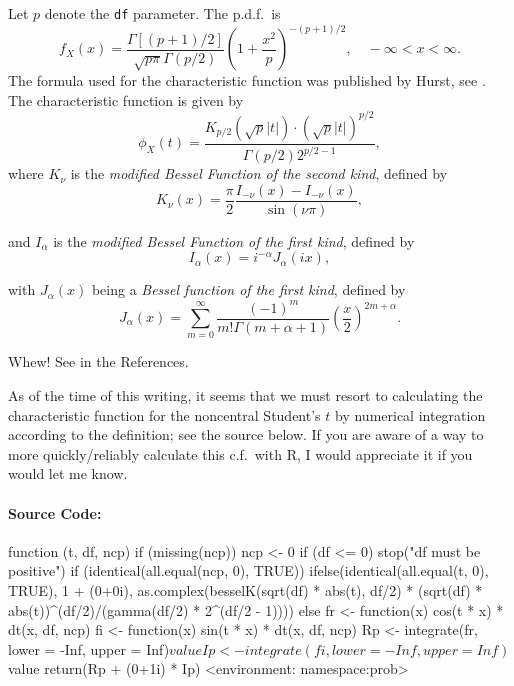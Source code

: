 \documentclass[english]{article}
\begin{document}
Let $p$ denote the \texttt{df} parameter. The p.d.f.~is \[
f_{X}(x)=\frac{\Gamma[(p+1)/2]}{\sqrt{p\pi}\Gamma(p/2)}\left(1+\frac{x^{2}}{p}\right)^{-(p+1)/2},\quad-\infty<x<\infty.\]
The formula used for the characteristic function was published by
Hurst, see \cite{studentst}. The characteristic function is given
by \[
\phi_{X}(t)=\frac{K_{p/2}(\sqrt{p}|t|)\cdot(\sqrt{p}|t|)^{p/2}}{\Gamma(p/2)2^{p/2-1}},\]
where $K_{\nu}$ is the \emph{modified Bessel Function of the second
kind}, defined by\[
K_{\nu}(x)=\frac{\pi}{2}\frac{I_{-\nu}(x)-I_{-\nu}(x)}{\sin(\nu\pi)},\]


and $I_{\alpha}$ is the \emph{modified Bessel Function of the first
kind}, defined by\[
I_{\alpha}(x)=i^{-\alpha}J_{\alpha}(ix),\]


with $J_{\alpha}(x)$ being a \emph{Bessel function of the first kind},
defined by\[
J_{\alpha}(x)=\sum_{m=0}^{\infty}\frac{(-1)^{m}}{m!\Gamma(m+\alpha+1)}\left(\frac{x}{2}\right)^{2m+\alpha}.\]


Whew! See \cite{Bessel} in the References. 

As of the time of this writing, it seems that we must resort to calculating
the characteristic function for the noncentral Student's $t$ by numerical
integration according to the definition; see the source below. If
you are aware of a way to more quickly/reliably calculate this c.f.~with
\textsf{R}, I would appreciate it if you would let me know.


\paragraph*{Source Code:}

\begin{Schunk}
\begin{Soutput}
function (t, df, ncp) 
{
    if (missing(ncp)) 
        ncp <- 0
    if (df <= 0) 
        stop("df must be positive")
    if (identical(all.equal(ncp, 0), TRUE)) {
        ifelse(identical(all.equal(t, 0), TRUE), 1 + (0+0i), 
            as.complex(besselK(sqrt(df) * abs(t), df/2) * (sqrt(df) * 
                abs(t))^(df/2)/(gamma(df/2) * 2^(df/2 - 1))))
    }
    else {
        fr <- function(x) cos(t * x) * dt(x, df, ncp)
        fi <- function(x) sin(t * x) * dt(x, df, ncp)
        Rp <- integrate(fr, lower = -Inf, upper = Inf)$value
        Ip <- integrate(fi, lower = -Inf, upper = Inf)$value
        return(Rp + (0+1i) * Ip)
    }
}
<environment: namespace:prob>
\end{Soutput}
\end{Schunk}
\end{document}
